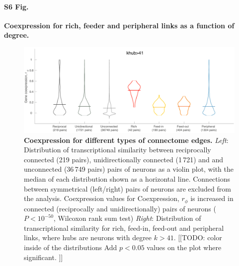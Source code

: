 \documentclass[10pt,letterpaper]{article}
\begin{document}
\paragraph*{S6 Fig.}
{\bf Coexpression for rich, feeder and peripheral links as a function of degree.}
\begin{figure}[h]
\centering
    \includegraphics[width=1\textwidth]{Distributions.pdf}
    \caption{
\textbf{Coexpression for different types of connectome edges.}
\emph{Left}: Distribution of transcriptional similarity between reciprocally connected (219 pairs), unidirectionally connected (1\,721) and  and unconnected (36\,749 pairs) pairs of neurons as a violin plot, with the median of each distribution shown as a horizontal line.
Connections between symmetrical (left/right) pairs of neurons are excluded from the analysis. Coexpression values for 
Coexpression, $r_\phi$ is increased in connected (reciprocally and unidirectionally) pairs of neurons ($P < 10^{-50}$, Wilcoxon rank sum test)
\emph{Right}: Distribution of transcriptional similarity for rich, feed-in, feed-out and peripheral links, where hubs are neurons with degree $k>41$.
[[TODO: color inside of the distributions
Add $p<0.05$ values on the plot where significant.
]]
\label{fig:S_RFPdistributions}
}
\end{figure}

\end{document}
